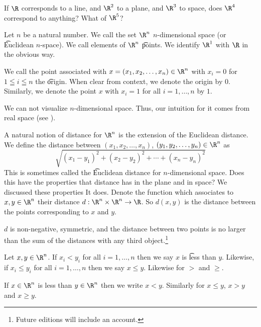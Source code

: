 

If $\R$ corresponds to a line, and $\R^2$ to a plane, and $\R^3$ to space, does $\R^4$ correspond to anything? What of $\R^5$?


Let $n$ be a natural number.
We call the set $\R^n$ \t{$n$-dimensional space} (or \t{Euclidean $n$-space}).
We call elements of $\R^n$ \t{points}.
We identify $\R^1$ with $\R$ in the obvious way.

We call the point associated with $x = (x_1, x_2, \dots, x_n) \in \R^n$ with $x_i = 0$ for $1 \leqq i \leqq n$ the \t{origin}.
When clear from context, we denote the origin by $0$.
Similarly, we denote the point $x$ with $x_i = 1$ for all $i = 1, \dots, n$ by $1$.


We can not visualize $n$-dimensional space.
Thus, our intuition for it comes from real space (see ).


A natural notion of distance for $\R^n$ is the extension of the Euclidean distance. We define the distance between $(x_1, x_2, \dots, x_n)$, $(y_1, y_2, \dots, y_n) \in \R^n$ as
\[
  \sqrt{(x_1 - y_1)^2 + (x_2 - y_2)^2 + \cdots + (x_n - y_n)^2}
\]
This is sometimes called the \t{Euclidean distance for $n$-dimensional space}.
Does this have the properties that distance has in the plane and in space?
We discussed these properties
It does.
Denote the function which associates to $x, y \in \R^n$ their distance $d: \R^n \times \R^n \to \R$.
So $d(x, y)$ is the distance between the points corresponding to $x$ and $y$.
\begin{proposition}
  $d$ is non-negative, symmetric, and the distance between two points is no larger than the sum of the distances with any third object.\footnote{Future editions will include an account.}
\end{proposition}


Let $x, y \in \R^n$.
If $x_i < y_i$ for all $i = 1, \dots, n$ then we say $x$ is \t{less than} $y$.
Likewise, if $x_i \leq y_i$ for all $i = 1, \dots, n$ then we say $x \leq y$.
Likewise for $>$ and $\geq$.


If $x \in \R^n$ is less than $y \in \R^n$  then we write $x < y$.
Similarly for $x \leq y$, $x > y$ and $x \geq y$.

